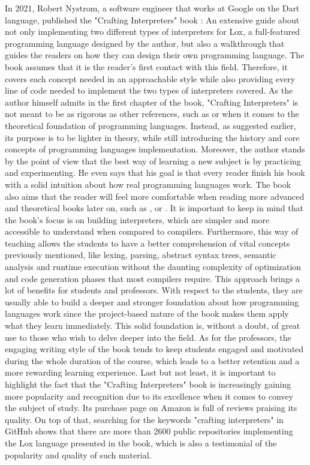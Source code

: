 In 2021, Robert Nystrom, a software engineer that works at Google on the Dart language, published the "Crafting Interpreters" book \cite{nystrom2021crafting}: An extensive guide about not only implementing two different types of interpreters for Lox, a full-featured programming language designed by the author, but also a walkthrough that guides the readers on how they can design their own programming language. The book assumes that it is the reader's first contact with this field. Therefore, it covers each concept needed in an approachable style while also providing every line of code needed to implement the two types of interpreters covered. As the author himself admits in the first chapter of the book, "Crafting Interpreters" is not meant to be as rigorous as other references, such as \cite{aho1986compilers} or \cite{cooper2022engineering} when it comes to the theoretical foundation of programming languages. Instead, as suggested earlier, its purpose is to be lighter in theory, while still introducing the history and core concepts of programming languages implementation. Moreover, the author stands by the point of view that the best way of learning a new subject is by practicing and experimenting. He even says that his goal is that every reader finish his book with a solid intuition about how real programming languages work. The book also aims that the reader will feel more comfortable when reading more advanced and theoretical books later on, such as \cite{aho1986compilers}, \cite{cooper2022engineering} or \cite{muchnick1997advanced}. It is important to keep in mind that the book's focus is on building interpreters, which are simpler and more accessible to understand when compared to compilers. Furthermore, this way of teaching allows the students to have a better comprehension of vital concepts previously mentioned, like lexing, parsing, abstract syntax trees, semantic analysis and runtime execution without the daunting complexity of optimization and code generation phases that most compilers require. This approach brings a lot of benefits for students and professors. With respect to the students, they are usually able to build a deeper and stronger foundation about how programming languages work since the project-based nature of the book makes them apply what they learn immediately. This solid foundation is, without a doubt, of great use to those who wish to delve deeper into the field. As for the professors, the engaging writing style of the book tends to keep students engaged and motivated during the whole duration of the course, which leads to a better retention and a more rewarding learning experience. Last but not least, it is important to highlight the fact that the "Crafting Interpreters" book is increasingly gaining more popularity and recognition due to its excellence when it comes to convey the subject of study. Its purchase page on Amazon \cite{nystrom_crafting_interpreters_amazon} is full of reviews praising its quality. On top of that, searching for the keywords "crafting interpreters" \cite{crafting_interpreters_repositories_github} in GitHub shows that there are more than 2600 public repositories implementing the Lox language presented in the book, which is also a testimonial of the popularity and quality of such material.


